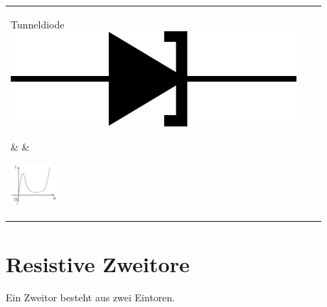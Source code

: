 \documentclass[fs, footer]{latex4ei}
\begin{document}
\begin{multicols*}{4}
\begin{tabular}{@{}p{1.1cm}p{2.9cm}l}
        \parbox{1.3cm}{ Tunneldiode   \\ \includegraphics{./img/symb/symb_diode_tunnel2.png} }&  & \parbox{1.8cm}{\includegraphics[width=1.7cm]{./img/char/char_diode_tunnel.png} }
    \end{tabular}

    \columnbreak
    \section{Resistive Zweitore}
    Ein Zweitor besteht aus zwei Eintoren.\\


\end{multicols*}
\end{document}
